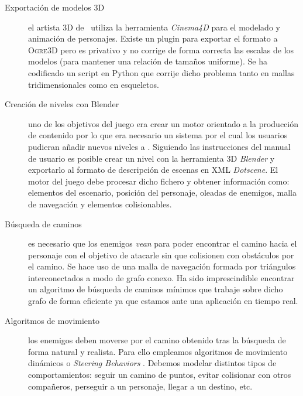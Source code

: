 \documentclass[a4paper,11pt]{article}
\begin{document}
\begin{description}
    \item [Exportación de modelos 3D] el artista 3D de \juego\ utiliza la herramienta
    \textit{Cinema4D} para el modelado y animación de personajes. Existe un
    plugin para exportar el formato a \textsc{Ogre3D} pero es privativo y no
    corrige de forma correcta las escalas de los modelos (para mantener una
    relación de tamaños uniforme). Se ha codificado un script en Python
    que corrije dicho problema tanto en mallas tridimensionales como en
    esqueletos.\\
    
    \item [Creación de niveles con Blender] uno de los objetivos del juego
    era crear un motor orientado a la producción de contenido por lo que
    era necesario un sistema por el cual los usuarios pudieran añadir nuevos
    niveles a \juego. Siguiendo las instrucciones del manual de usuario
    es posible crear un nivel con la herramienta 3D \textit{Blender} y
    exportarlo al formato de descripción de escenas en XML \textit{Dotscene}.
    El motor del juego debe procesar dicho fichero y obtener información como:
    elementos del escenario, posición del personaje, oleadas de enemigos,
    malla de navegación y elementos colisionables.\\
    
    \item [Búsqueda de caminos] es necesario que los enemigos \textit{vean}
    para poder encontrar el camino hacia el personaje con el objetivo de
    atacarle sin que colisionen con obstáculos por el camino. Se hace uso
    de una malla de navegación formada por triángulos interconectados a modo
    de grafo conexo. Ha sido imprescindible encontrar un algoritmo de
    búsqueda de caminos mínimos que trabaje sobre dicho grafo de forma
    eficiente ya que estamos ante una aplicación en tiempo real.\\
    
    \item [Algoritmos de movimiento] los enemigos deben moverse por el camino
    obtenido tras la búsqueda de forma natural y realista. Para ello
    empleamos algoritmos de movimiento dinámicos o \textit{Steering
    Behaviors} \cite{mill09}. Debemos modelar distintos tipos de comportamientos:
    seguir un camino de puntos, evitar colisionar con otros compañeros,
    perseguir a un personaje, llegar a un destino, etc.\\

\end{description}
\end{document}
